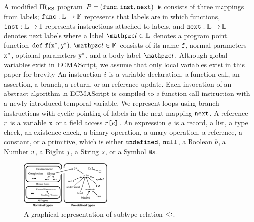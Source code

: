 A modified ${\text{IR}_\text{ES}}$ program $P = (\mathtt{func}, \mathtt{inst}, \mathtt{next})$ is consists
of three mappings from labels;  $\mathtt{func}: \mathbb{L} \rightarrow \mathbb{F}$
represents that labels are in which functions, $\mathtt{inst}: \mathbb{L} \rightarrow
\mathbb{I}$ represents instructions attached to labels, and $\mathtt{next}: \mathbb{L}
\rightarrow \mathbb{L}$ denotes next labels where a label $\lab \in \labset$
denotes a program point.  function $\kwdef \; \f (\x^*, \y^*). \; \lab \in
\funcset$ consists of its name $\texttt{f}$, normal parameters $\texttt{x}^*$, optional
parameters $\texttt{y}^*$, and a body label $\lab$.  Although global variables exist in
ECMAScript, we assume that only local variables exist in this paper for brevity
An instruction $i$ is a variable declaration, a function call, an assertion,
a branch, a return, or an reference update.  Each invocation of an abstract
algorithm in ECMAScript is compiled to a function call instruction with a newly
introduced temporal variable.  We represent loops using branch instructions with
cyclic pointing of labels in the next mapping $\mathtt{next}$.  A reference $r$
is a variable $\texttt{x}$ or a field access $r \texttt{[} e \texttt{]}$.  An expression
$e$ is a record, a list, a type check, an existence check, a binary
operation, a unary operation, a reference, a constant, or a primitive, which is
either $\texttt{undefined}$, $\texttt{null}$, a Boolean $b$, a Number $n$, a BigInt
$j$, a String $s$, or a Symbol $\texttt{@}s$.

\begin{figure}
  \centering
  \includegraphics[width=0.4\textwidth]{img/subtype}
  \vspace*{-1.5em}
  \caption{A graphical representation of subtype relation $<:$.}
  \label{fig:subtype}
  \vspace*{-1.5em}
\end{figure}

